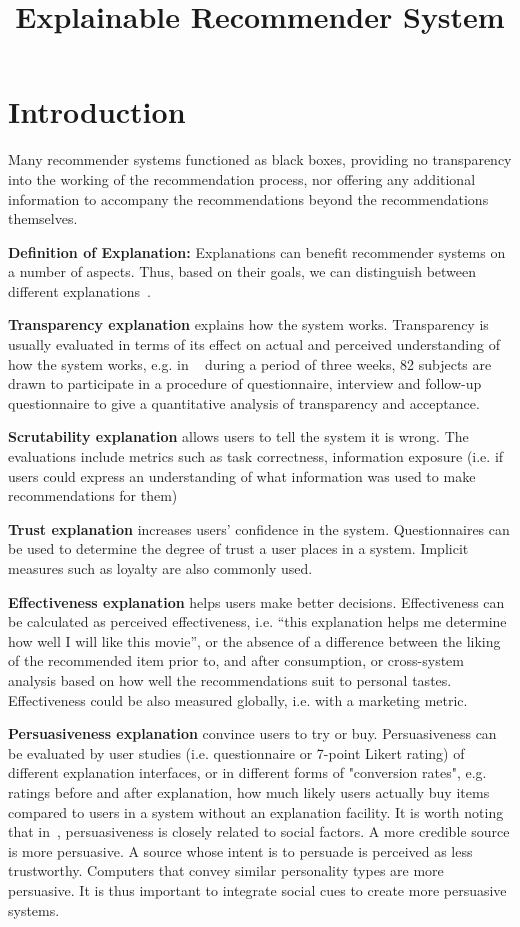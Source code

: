 \documentclass{article}
\begin{document}
\title{Explainable Recommender System}
\maketitle
\section{Introduction}

Many recommender systems functioned as black boxes, providing no transparency into the working of the recommendation process, nor offering any additional information to accompany the recommendations beyond the recommendations themselves.

\textbf{Definition of Explanation:} Explanations can benefit recommender systems on a number of aspects. Thus, based on their goals, we can distinguish between different explanations~\cite{Tintarev2011Designing}. 

\textbf{Transparency explanation} explains how the system works. Transparency is usually evaluated in terms of its effect on actual and perceived understanding of how the system works, e.g. in ~\cite{Cramer2008effects} during a period of three weeks, 82 subjects are drawn to participate in a procedure of questionnaire, interview and follow-up questionnaire to give a quantitative  analysis of transparency and acceptance. 

\textbf{Scrutability explanation} allows users to tell the system it is wrong. The evaluations include metrics such as task correctness, information exposure (i.e. if users could express an understanding of what information was used to make recommendations for them)

\textbf{Trust explanation} increases users’ confidence in the system. Questionnaires can be used to determine the degree of trust a user places in a system. Implicit measures such as loyalty are also commonly used. 

\textbf{Effectiveness explanation} helps users make better decisions. Effectiveness can be calculated as perceived effectiveness, i.e. ``this explanation helps me determine how well I will like this movie'', or the absence of a difference between the liking of the recommended item prior to, and after consumption, or cross-system analysis based on how well the recommendations suit to personal tastes. Effectiveness could be also measured globally, i.e. with a marketing metric. 

\textbf{Persuasiveness explanation} convince users to try or buy. Persuasiveness can be evaluated by user studies (i.e. questionnaire or 7-point Likert rating) of different explanation interfaces, or in different forms of "conversion rates", e.g. ratings before and after explanation, how much likely users actually buy items compared to users in a system without an explanation facility. It is worth noting that in~\cite{Yoo2011Creating}, persuasiveness is closely related to social factors. A more credible source is more persuasive. A source whose intent is to persuade is perceived as less trustworthy. Computers that convey similar personality types are more persuasive. It is thus important to integrate social cues to create more persuasive systems.
\end{document}
